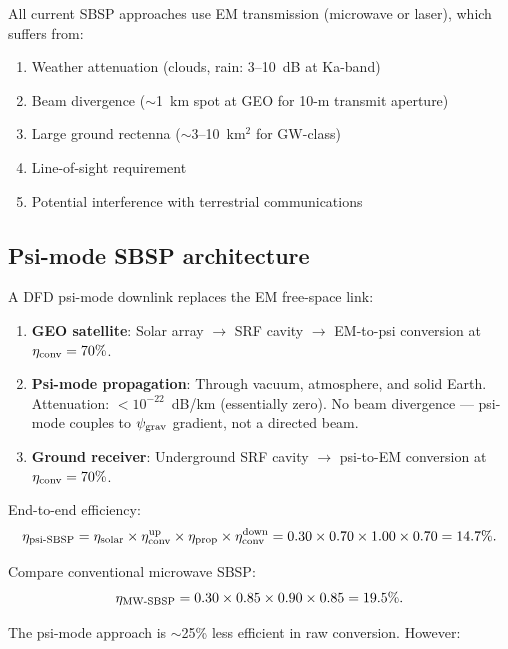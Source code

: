 \documentclass[11pt]{article}
\newcommand{\psigrav}{\psi_{\rm grav}}
\begin{document}
All current SBSP approaches use EM transmission (microwave or laser),
which suffers from:
\begin{enumerate}[nosep]
\item Weather attenuation (clouds, rain: 3--10~dB at Ka-band)
\item Beam divergence ($\sim$1~km spot at GEO for 10-m transmit aperture)
\item Large ground rectenna ($\sim$3--10~km$^2$ for GW-class)
\item Line-of-sight requirement
\item Potential interference with terrestrial communications
\end{enumerate}

\subsection{Psi-mode SBSP architecture}

A DFD psi-mode downlink replaces the EM free-space link:

\begin{enumerate}
\item \textbf{GEO satellite}: Solar array $\to$ SRF cavity $\to$ EM-to-psi
  conversion at $\eta_{\rm conv} = 70\%$.
\item \textbf{Psi-mode propagation}: Through vacuum, atmosphere, and solid
  Earth. Attenuation: $< 10^{-22}$~dB/km (essentially zero). No beam
  divergence --- psi-mode couples to $\psigrav$ gradient, not a directed beam.
\item \textbf{Ground receiver}: Underground SRF cavity $\to$ psi-to-EM
  conversion at $\eta_{\rm conv} = 70\%$.
\end{enumerate}

End-to-end efficiency:
\begin{equation}
\eta_{\rm psi\text{-}SBSP} = \eta_{\rm solar} \times \eta_{\rm conv}^{\rm up}
\times \eta_{\rm prop} \times \eta_{\rm conv}^{\rm down}
= 0.30 \times 0.70 \times 1.00 \times 0.70 = 14.7\%.
\end{equation}

Compare conventional microwave SBSP:
\begin{equation}
\eta_{\rm MW\text{-}SBSP} = 0.30 \times 0.85 \times 0.90 \times 0.85
= 19.5\%.
\end{equation}

The psi-mode approach is $\sim$25\% less efficient in raw conversion.
However:
\end{document}
